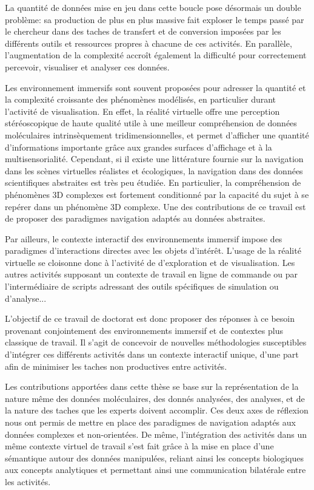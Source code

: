 La quantité de données mise en jeu dans cette boucle pose désormais un double problème: sa production de plus en plus massive fait exploser le temps passé par le chercheur dans des taches de transfert et de conversion imposées par les différents outils et ressources propres à chacune de ces activités. En parallèle, l'augmentation de la complexité accroît également la difficulté pour correctement percevoir, visualiser et analyser ces données.

Les environnement immersifs sont souvent proposées pour adresser la quantité et la complexité croissante des phénomènes modélisés, en particulier durant l'activité de visualisation. En effet, la réalité virtuelle offre une perception stéréoscopique de haute qualité utile à une meilleur compréhension de données moléculaires intrinsèquement tridimensionnelles, et permet d'afficher une quantité d'informations importante grâce aux grandes surfaces d'affichage et à la multisensorialité. Cependant, si il existe une littérature fournie sur la navigation dans les scènes virtuelles réalistes et écologiques, la navigation dans des données scientifiques abstraites est très peu étudiée. En particulier, la compréhension de phénomènes 3D complexes est fortement conditionné par la capacité du sujet à se repérer dans un phénomène 3D complexe. Une des contributions de ce travail est de proposer des paradigmes navigation adaptés au données abstraites. 

Par ailleurs, le contexte interactif des environnements immersif impose des paradigmes d'interactions directes avec les objets d'intérêt. L'usage de la réalité virtuelle se cloisonne donc à l'activité de d'exploration et de visualisation. Les autres activités supposant un contexte de travail en ligne de commande ou par l'intermédiaire de scripts adressant des outils spécifiques de simulation ou d'analyse...

L'objectif de ce travail de doctorat est donc proposer des réponses à ce besoin provenant conjointement des environnements immersif et de contextes plus classique de travail. Il s'agit de concevoir de nouvelles méthodologies susceptibles d'intégrer ces différents activités dans un contexte interactif unique, d'une part afin de minimiser les taches non productives entre activités.

Les contributions apportées dans cette thèse se base sur la représentation de la nature même des données moléculaires, des donnés analysées, des analyses, et de la nature des taches que les experts doivent accomplir. Ces deux axes de réflexion nous ont permis de mettre en place des paradigmes de navigation adaptés aux données complexes et non-orientées. De même, l'intégration des activités dans un même contexte virtuel de travail s'est fait grâce à la mise en place d'une sémantique autour des données manipulées, reliant ainsi les concepts biologiques aux concepts analytiques et permettant ainsi une communication bilatérale entre les activités.

